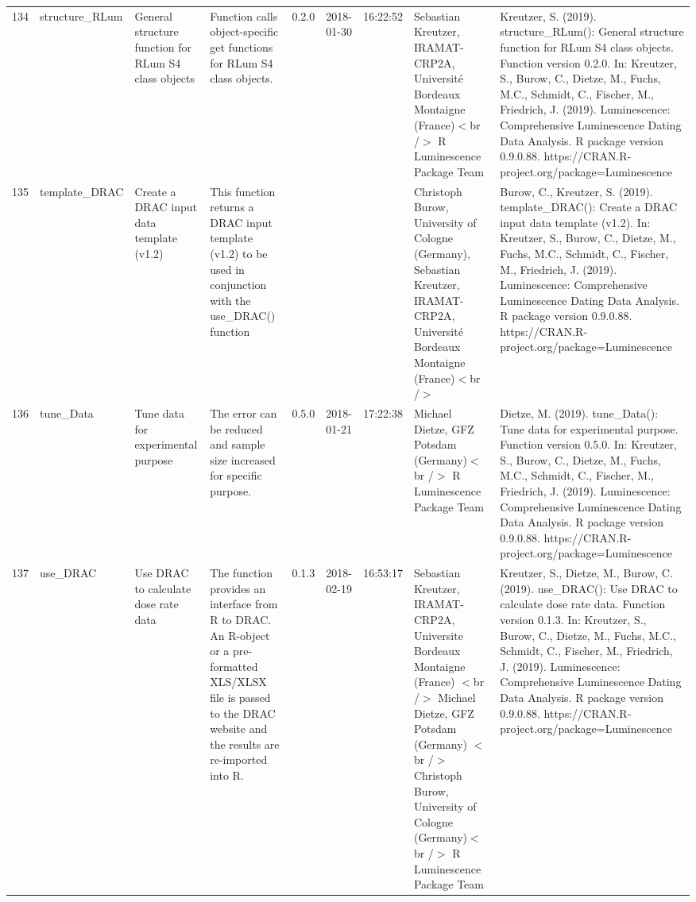\begin{table}[ht]
\begin{tabular}{rllllllll}
 \\ 
  134 & structure\_RLum & General structure function for RLum S4 class objects & Function calls object-specific get functions for RLum S4 class objects. & 0.2.0 & 2018-01-30 & 16:22:52
 & Sebastian Kreutzer, IRAMAT-CRP2A, Université Bordeaux Montaigne (France)$<$br /$>$  R Luminescence Package Team & Kreutzer, S. (2019). structure\_RLum(): General structure function for RLum S4 class objects. Function version 0.2.0. In: Kreutzer, S., Burow, C., Dietze, M., Fuchs, M.C., Schmidt, C., Fischer, M., Friedrich, J. (2019). Luminescence: Comprehensive Luminescence Dating Data Analysis. R package version 0.9.0.88. https://CRAN.R-project.org/package=Luminescence
 \\ 
  135 & template\_DRAC & Create a DRAC input data template (v1.2) & This function returns a DRAC input template (v1.2) to be used in conjunction with the use\_DRAC() function &  &  &  & Christoph Burow, University of Cologne (Germany), Sebastian Kreutzer, IRAMAT-CRP2A, Université Bordeaux Montaigne (France)$<$br /$>$ & Burow, C., Kreutzer, S. (2019). template\_DRAC(): Create a DRAC input data template (v1.2). In: Kreutzer, S., Burow, C., Dietze, M., Fuchs, M.C., Schmidt, C., Fischer, M., Friedrich, J. (2019). Luminescence: Comprehensive Luminescence Dating Data Analysis. R package version 0.9.0.88. https://CRAN.R-project.org/package=Luminescence
 \\ 
  136 & tune\_Data & Tune data for experimental purpose & The error can be reduced and sample size increased for specific purpose. & 0.5.0 & 2018-01-21 & 17:22:38
 & Michael Dietze, GFZ Potsdam (Germany)$<$br /$>$  R Luminescence Package Team & Dietze, M. (2019). tune\_Data(): Tune data for experimental purpose. Function version 0.5.0. In: Kreutzer, S., Burow, C., Dietze, M., Fuchs, M.C., Schmidt, C., Fischer, M., Friedrich, J. (2019). Luminescence: Comprehensive Luminescence Dating Data Analysis. R package version 0.9.0.88. https://CRAN.R-project.org/package=Luminescence
 \\ 
  137 & use\_DRAC & Use DRAC to calculate dose rate data & The function provides an interface from R to DRAC. An R-object or a pre-formatted XLS/XLSX file is passed to the DRAC website and the results are re-imported into R. & 0.1.3 & 2018-02-19 & 16:53:17
 & Sebastian Kreutzer, IRAMAT-CRP2A, Universite Bordeaux Montaigne (France) $<$br /$>$ Michael Dietze, GFZ Potsdam (Germany) $<$br /$>$ Christoph Burow, University of Cologne (Germany)$<$br /$>$  R Luminescence Package Team & Kreutzer, S., Dietze, M., Burow, C. (2019). use\_DRAC(): Use DRAC to calculate dose rate data. Function version 0.1.3. In: Kreutzer, S., Burow, C., Dietze, M., Fuchs, M.C., Schmidt, C., Fischer, M., Friedrich, J. (2019). Luminescence: Comprehensive Luminescence Dating Data Analysis. R package version 0.9.0.88. https://CRAN.R-project.org/package=Luminescence

\end{tabular}
\end{table}
